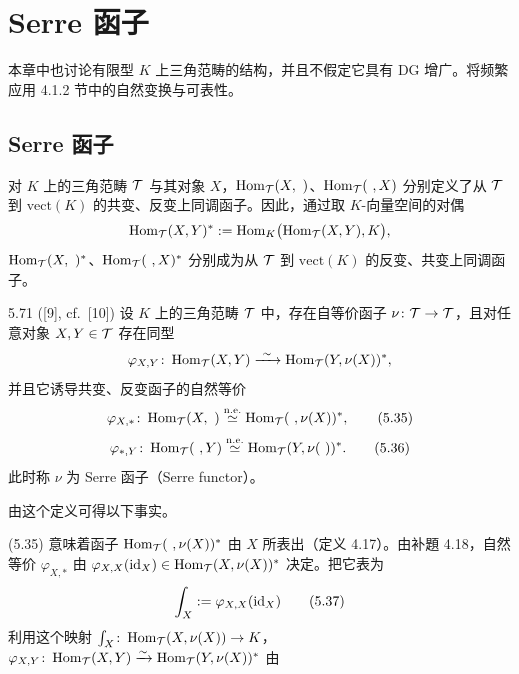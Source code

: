 
\section{Serre 函子}

本章中也讨论有限型 $K$ 上三角范畴的结构，并且不假定它具有 DG 增广。将频繁应用 4.1.2 节中的自然变换与可表性。

\subsection{Serre 函子}

对 $K$ 上的三角范畴 $\mathcal{T}$ 与其对象 $X$，$\operatorname{Hom}_{\mathcal{T}}(X,\ )$、$\operatorname{Hom}_{\mathcal{T}}(\ ,X)$ 分别定义了从 $\mathcal{T}$ 到 $\mathrm{vect}(K)$ 的共变、反变上同调函子。因此，通过取 $K$-向量空间的对偶
\[
  \operatorname{Hom}_{\mathcal{T}}(X,Y)^{*} := \operatorname{Hom}_{K}\bigl(\operatorname{Hom}_{\mathcal{T}}(X,Y), K\bigr),
\]
$\operatorname{Hom}_{\mathcal{T}}(X,\ )^{*}$、$\operatorname{Hom}_{\mathcal{T}}(\ ,X)^{*}$ 分别成为从 $\mathcal{T}$ 到 $\mathrm{vect}(K)$ 的反变、共变上同调函子。

\begin{definition}{5.71} ([9], cf.\ [10]) 设 $K$ 上的三角范畴 $\mathcal{T}$ 中，存在自等价函子 $\nu \colon \mathcal{T} \to \mathcal{T}$，且对任意对象 $X,Y \in \mathcal{T}$ 存在同型
\[
  \varphi_{X,Y} \colon \operatorname{Hom}_{\mathcal{T}}(X,Y) \xrightarrow{\ \sim\ } \operatorname{Hom}_{\mathcal{T}}(Y,\nu(X))^{*},
\]
并且它诱导共变、反变函子的自然等价
\begin{equation}
  \varphi_{X,*} \colon \operatorname{Hom}_{\mathcal{T}}(X,\ ) \overset{\mathrm{n.e.}}{\simeq} \operatorname{Hom}_{\mathcal{T}}(\ ,\nu(X))^{*}, \tag{5.35}
\end{equation}
\begin{equation}
  \varphi_{*,Y} \colon \Hom_{\cT}(\ ,Y) \overset{\mathrm{n.e.}}{\simeq} \Hom_{\cT}(Y,\nu(\ ))^{*}. \tag{5.36}
\end{equation}
此时称 $\nu$ 为 Serre 函子（Serre functor）。\end{definition}

由这个定义可得以下事实。

(5.35) 意味着函子 $\Hom_{\cT}(\ ,\nu(X))^{*}$ 由 $X$ 所表出（定义 4.17）。由补題 4.18，自然等价 $\varphi_{X,*}$ 由 $\varphi_{X,X}(\mathrm{id}_{X}) \in \operatorname{Hom}_{\mathcal{T}}(X,\nu(X))^{*}$ 决定。把它表为
\begin{equation}
  \int_{X} := \varphi_{X,X}(\mathrm{id}_{X}) \tag{5.37}
\end{equation}
利用这个映射 $\int_{X} \colon \operatorname{Hom}_{\mathcal{T}}(X,\nu(X)) \to K$，$\varphi_{X,Y} \colon \operatorname{Hom}_{\mathcal{T}}(X,Y) \xrightarrow{\sim} \operatorname{Hom}_{\mathcal{T}}(Y,\nu(X))^{*}$ 由


